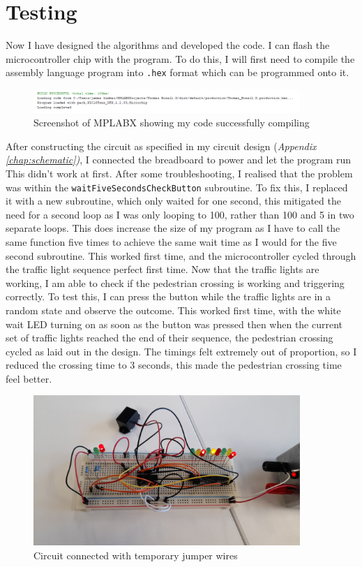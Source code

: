 \chapter{Testing}
\label{chap:testing}
Now I have designed the algorithms and developed the code. I can flash the microcontroller chip with the program. To do this, I will first need to compile the assembly language program into \verb|.hex| format which can be programmed onto it. \newline
\begin{figure}[H]
    \centering
    \includegraphics[width=0.9\textwidth]{images/compileSuccessful.png}
    \caption{Screenshot of MPLABX showing my code successfully compiling}
    \label{fig:compileSuccessful}
\end{figure}
\noindent After constructing the circuit as specified in my circuit design (\textit{Appendix \ref{chap:schematic})}, I connected the breadboard to power and let the program run \newline
This didn't work at first. After some troubleshooting, I realised that the problem was within the \verb|waitFiveSecondsCheckButton| subroutine. To fix this, I replaced it with a new subroutine, which only waited for one second, this mitigated the need for a second loop as I was only looping to 100, rather than 100 and 5 in two separate loops. This does increase the size of my program as I have to call the same function five times to achieve the same wait time as I would for the five second subroutine. This worked first time, and the microcontroller cycled through the traffic light sequence perfect first time. \newline
Now that the traffic lights are working, I am able to check if the pedestrian crossing is working and triggering correctly. To test this, I can press the button while the traffic lights are in a random state and observe the outcome. This worked first time, with the white wait LED turning on as soon as the button was pressed then when the current set of traffic lights reached the end of their sequence, the pedestrian crossing cycled as laid out in the design. The timings felt extremely out of proportion, so I reduced the crossing time to 3 seconds, this made the pedestrian crossing time feel better.
\begin{figure}[H]
    \centering
    \includegraphics[width=0.9\textwidth]{images/unneatened.jpg}
    \caption{Circuit connected with temporary jumper wires}
    \label{fig:unneatened}
\end{figure}
